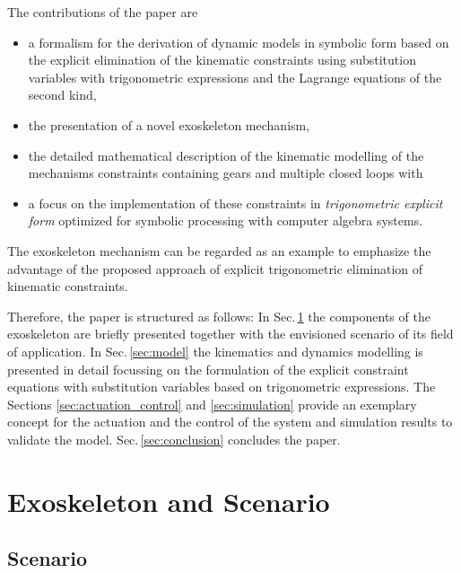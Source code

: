 \documentclass[letterpaper, 10 pt, conference]{ieeeconf}  %
\begin{document}
%
%
%
%
%

The contributions of the paper are
\begin{itemize}
    \item a formalism for the derivation of dynamic models in symbolic form based on the explicit elimination of the kinematic constraints using substitution variables with trigonometric expressions and the Lagrange equations of the second kind,
    \item the presentation of a novel exoskeleton mechanism,
    \item the detailed mathematical description of the kinematic modelling of the mechanisms constraints containing gears and multiple closed loops with
    \item a focus on the implementation of these constraints in \emph{trigonometric explicit form} optimized for symbolic processing with computer algebra systems.
\end{itemize}

The exoskeleton mechanism can be regarded as an example to emphasize the advantage of the proposed approach of explicit trigonometric elimination of kinematic constraints.

Therefore, the paper is structured as follows:
In Sec.\,\ref{sec:exo_scenario} the components of the exoskeleton are briefly presented together with the envisioned scenario of its field of application. In Sec.\,\ref{sec:model} the kinematics and dynamics modelling is presented in detail focussing on the formulation of the explicit constraint equations with substitution variables based on trigonometric expressions.
The Sections \ref{sec:actuation_control} and
\ref{sec:simulation} provide an exemplary concept for the actuation and the control of the system and simulation results to validate the model. Sec.\,\ref{sec:conclusion} concludes the paper.

\section{Exoskeleton and Scenario}
\label{sec:exo_scenario}
\subsection{Scenario}
\end{document}
